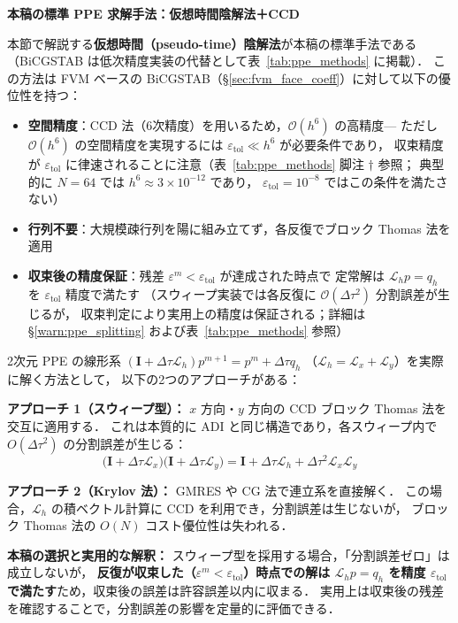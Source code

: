 \begin{tcolorbox}[resultbox]
\textbf{本稿の標準 PPE 求解手法：仮想時間陰解法＋CCD}

本節で解説する\textbf{仮想時間（pseudo-time）陰解法}が本稿の標準手法である
（BiCGSTAB は低次精度実装の代替として表~\ref{tab:ppe_methods} に掲載）．
この方法は FVM ベースの BiCGSTAB（§\ref{sec:fvm_face_coeff}）に対して以下の優位性を持つ：
\begin{itemize}
  \item \textbf{空間精度}：CCD 法（6次精度）を用いるため，$\mathcal{O}(h^6)$ の高精度—
        ただし $\mathcal{O}(h^6)$ の空間精度を実現するには $\varepsilon_\text{tol} \ll h^6$ が必要条件であり，
        収束精度が $\varepsilon_\text{tol}$ に律速されることに注意（表~\ref{tab:ppe_methods} 脚注 $\dagger$ 参照；
        典型的に $N=64$ では $h^6 \approx 3\times10^{-12}$ であり，
        $\varepsilon_\text{tol} = 10^{-8}$ ではこの条件を満たさない）
  \item \textbf{行列不要}：大規模疎行列を陽に組み立てず，各反復でブロック Thomas 法を適用
  \item \textbf{収束後の精度保証}：残差 $\varepsilon^m < \varepsilon_\text{tol}$ が達成された時点で
        定常解は $\mathcal{L}_h p = q_h$ を $\varepsilon_\text{tol}$ 精度で満たす
        （スウィープ実装では各反復に $\mathcal{O}(\Delta\tau^2)$ 分割誤差が生じるが，
        収束判定により実用上の精度は保証される；詳細は §\ref{warn:ppe_splitting} および表~\ref{tab:ppe_methods} 参照）
\end{itemize}
\end{tcolorbox}

\begin{tcolorbox}[warnbox, title={2次元求解における実装方法と分割誤差について}]
\label{warn:ppe_splitting}
2次元 PPE の線形系 $(\mathbf{I} + \Delta\tau\mathcal{L}_h)p^{m+1} = p^m + \Delta\tau q_h$
（$\mathcal{L}_h = \mathcal{L}_x + \mathcal{L}_y$）を実際に解く方法として，
以下の2つのアプローチがある：

\textbf{アプローチ 1（スウィープ型）：} $x$ 方向・$y$ 方向の CCD ブロック Thomas 法を交互に適用する．
これは本質的に ADI と同じ構造であり，各スウィープ内で $O(\Delta\tau^2)$ の分割誤差が生じる：
\[
  \bigl(\mathbf{I}+\Delta\tau\mathcal{L}_x\bigr)\bigl(\mathbf{I}+\Delta\tau\mathcal{L}_y\bigr)
  = \mathbf{I} + \Delta\tau\mathcal{L}_h + \Delta\tau^2\mathcal{L}_x\mathcal{L}_y
\]

\textbf{アプローチ 2（Krylov 法）：} GMRES や CG 法で連立系を直接解く．
この場合，$\mathcal{L}_h$ の積ベクトル計算に CCD を利用でき，分割誤差は生じないが，
ブロック Thomas 法の $O(N)$ コスト優位性は失われる．

\textbf{本稿の選択と実用的な解釈：}
スウィープ型を採用する場合，「分割誤差ゼロ」は成立しないが，
\textbf{反復が収束した（$\varepsilon^m < \varepsilon_\text{tol}$）時点での解は $\mathcal{L}_h p = q_h$ を精度
$\varepsilon_\text{tol}$ で満たす}ため，収束後の誤差は許容誤差以内に収まる．
実用上は収束後の残差を確認することで，分割誤差の影響を定量的に評価できる．
\end{tcolorbox}

